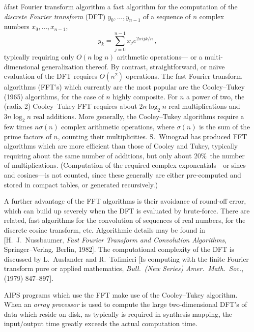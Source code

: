 \aa{fast Fourier transform algorithm}
a fast algorithm for the computation of the {\it discrete Fourier transform}
(DFT) $y_0,\dots,y_{n-1}$ of a sequence
of $n$ complex numbers $x_0,\dots,x_{n-1}$,
$$y_k=\sum_{j=0}^{n-1}x_j e^{2\pi ijk/n}\,,$$
typically requiring only $O(n\log n)$ arithmetic operations---%
or a multi-dimensional generalization thereof.
By contrast, straightforward, or na\"\i ve evaluation of the DFT
requires $O(n^2)$ operations.
The fast Fourier transform algorithms (FFT's) which currently are the
most popular are the Cooley--Tukey (1965) algorithms, for the case of
$n$ highly composite.
For $n$ a power of two, the (radix-2) Cooley--Tukey FFT requires
about $2n\log_2n$ real multiplications and $3n\log_2n$ real additions.
More generally, the Cooley--Tukey algorithms require
a few times $n\sigma(n)$ complex arithmetic operations,
where $\sigma(n)$ is the sum of the prime factors of $n$,
counting their multiplicities.
S.~Winograd has produced FFT algorithms which are more efficient than
those of Cooley and Tukey, typically requiring about the same number
of additions, but only about 20\%\ the number of multiplications.
(Computation of the required complex exponentials---or sines and
cosines---is not counted, since these generally are either pre-computed and
stored in compact tables, or generated recursively.)
\par
A further advantage of the FFT algorithms is their avoidance of
round-off error, which can build up severely when the DFT is
evaluated by brute-force.
There are related, fast algorithms for the convolution of sequences of
real numbers, for the discrete cosine transform, etc.
Algorithmic details may be found in [H.~J.~Nussbaumer,
{\it Fast Fourier Transform and Convolution Algorithms}, Springer--Verlag,
Berlin, 1982].
The computational complexity of the DFT is discussed by
L.~Auslander and R.~Tolimieri [Is computing with the finite
Fourier transform pure or applied mathematics, {\it Bull.\ (New Series)
Amer.\ Math.\ Soc.},  (1979) 847--897].
\par
AIPS programs which use the FFT make use of the Cooley--Tukey algorithm.
When an {\it array processor} is used to compute the large two-dimensional
DFT's of data which reside on disk, as typically is required in
synthesis mapping,
the input\slash output time greatly exceeds the actual computation time.

